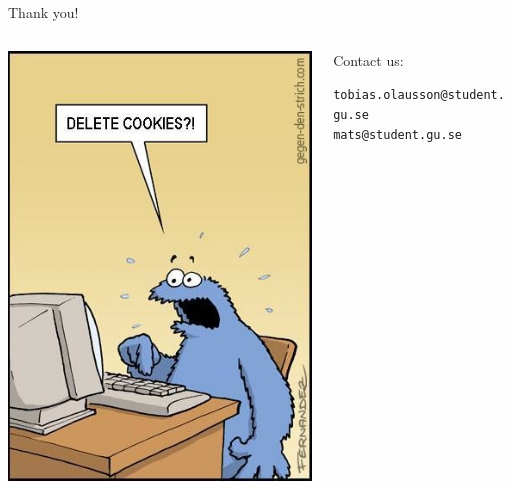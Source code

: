 \documentclass{beamer}
\begin{document}
\begin{frame}{Thank you!}
    \begin{columns}[c]
        \begin{column}{.5\textwidth}
            \includegraphics[height=.8\textheight]{cookies.jpg}
        \end{column}
        \begin{column}{.5\textwidth}
            Contact us: \vspace{1cm}

            \texttt{tobias.olausson@student.gu.se} \\
            \texttt{mats@student.gu.se}
        \end{column}
    \end{columns}
\end{frame}
\end{document}
